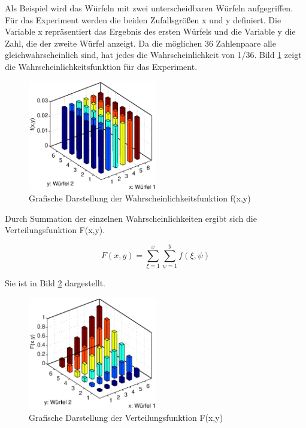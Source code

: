 \noindent Als Beispiel wird das W\"{u}rfeln mit zwei unterscheidbaren W\"{u}rfeln aufgegriffen. F\"{u}r das Experiment werden die beiden Zufallsgr\"{o}{\ss}en x und y definiert. Die Variable x repr\"{a}sentiert das Ergebnis des ersten W\"{u}rfels und die Variable y die Zahl, die der zweite W\"{u}rfel anzeigt. Da die m\"{o}glichen 36 Zahlenpaare alle gleichwahrscheinlich sind, hat jedes die Wahrscheinlichkeit von 1/36. Bild \ref{fig:Wuerfelexperiment1} zeigt die Wahrscheinlichkeitsfunktion f\"{u}r das Experiment.

\noindent 
\begin{figure}[H]
  \centerline{\includegraphics[width=0.5\textwidth]{Kapitel8/Bilder/image1}}
  \caption{Grafische Darstellung der Wahrscheinlichkeitsfunktion f(x,y)}
  \label{fig:Wuerfelexperiment1}
\end{figure}

\noindent Durch Summation der einzelnen Wahrscheinlichkeiten ergibt sich die Verteilungsfunktion F(x,y).

\begin{equation}\label{eq:eightsix}
F(x,y)=\sum _{\xi =1}^{x}\sum _{\psi =1}^{y}f(\xi ,\psi)
\end{equation}

\noindent Sie ist in Bild \ref{fig:Wuerfelexperiment2} dargestellt. 

\noindent 
\begin{figure}[H]
  \centerline{\includegraphics[width=0.5\textwidth]{Kapitel8/Bilder/image2}}
  \caption{Grafische Darstellung der Verteilungsfunktion F(x,y)}
  \label{fig:Wuerfelexperiment2}
\end{figure}

